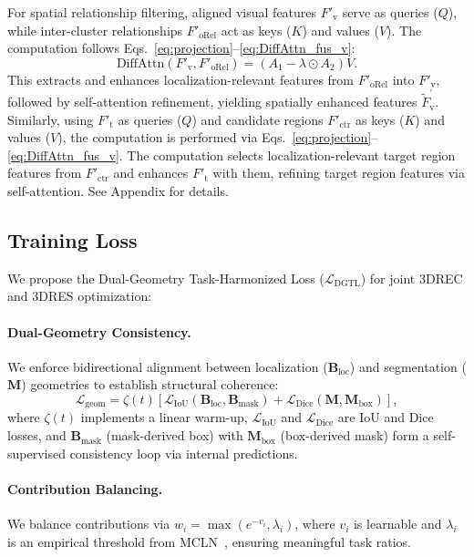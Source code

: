 \documentclass[letterpaper]{article} %
\begin{document}
For spatial relationship filtering, aligned visual features $F'_{\mathrm{v}}$ serve as queries ($Q$), while inter-cluster relationships $F'_{\mathrm{oRel}}$ act as keys ($K$) and values ($V$). The computation follows Eqs.~\ref{eq:projection}--\ref{eq:DiffAttn_fus_v}:
\begin{equation}
	\text{DiffAttn}(F'_{\mathrm{v}}, F'_{\mathrm{oRel}}) = (A_1 - \lambda \odot A_2)V.
	\label{eq:f_v_oRel}
\end{equation}
This extracts and enhances localization-relevant features from $F'_{\mathrm{oRel}}$ into $F'_{\mathrm{v}}$, followed by self-attention refinement, yielding spatially enhanced features $\tilde{F}_{\mathrm{v}}^{\prime}$.
Similarly, using $F'_{\mathrm{t}}$ as queries ($Q$) and candidate regions $F'_{\mathrm{ctr}}$ as keys ($K$) and values ($V$), the computation is performed via Eqs.~\ref{eq:projection}--\ref{eq:DiffAttn_fus_v}. The computation selects localization-relevant target region features from $F'_{\mathrm{ctr}}$ and enhances $F'_{\mathrm{t}}$ with them, refining target region features via self-attention. See Appendix for details.




\subsection{Training Loss}

We propose the Dual-Geometry Task-Harmonized Loss ($\mathcal{L}_{\text{DGTL}}$) for joint 3DREC and 3DRES optimization:

\paragraph{Dual-Geometry Consistency.} 
We enforce bidirectional alignment between localization ($\mathbf{B}_{\text{loc}}$) and segmentation ($\mathbf{M}$) geometries to establish structural coherence:
\[
\mathcal{L}_{\mathrm{geom}} = \zeta(t) \left[\mathcal{L}_{\mathrm{IoU}}(\mathbf{B}_{\mathrm{loc}}, \mathbf{B}_{\text{mask}}) + \mathcal{L}_{\mathrm{Dice}}(\mathbf{M}, \mathbf{M}_{\text{box}})\right],
\]
where $\zeta(t)$ implements a linear warm-up, $\mathcal{L}_{\mathrm{IoU}}$ and $\mathcal{L}_{\mathrm{Dice}}$ are IoU and Dice losses, and $\mathbf{B}_{\text{mask}}$ (mask-derived box) with $\mathbf{M}_{\text{box}}$ (box-derived mask) form a self-supervised consistency loop via internal predictions.


\paragraph{Contribution Balancing.}
We balance contributions via $w_i = \max(e^{-v_i}, \lambda_i)$, where $v_i$ is learnable and $\lambda_i$ is an empirical threshold from MCLN~\cite{qianMultibranchCollaborativeLearning2024}, ensuring meaningful task ratios.
\end{document}
